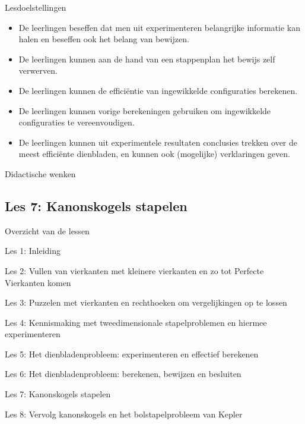 \documentclass[dutch]{beamer}
\begin{document}
\begin{frame}{Lesdoelstellingen}
\begin{itemize}
\item De leerlingen beseffen dat men uit experimenteren belangrijke informatie kan halen en beseffen ook het belang van bewijzen.
\item De leerlingen kunnen aan de hand van een stappenplan het bewijs zelf verwerven.
\item De leerlingen kunnen de effici\"{e}ntie van ingewikkelde configuraties berekenen.
\item De leerlingen kunnen vorige berekeningen gebruiken om ingewikkelde configuraties te vereenvoudigen.
\item De leerlingen kunnen uit experimentele resultaten conclusies trekken over de meest effici\"{e}nte dienbladen, en kunnen ook (mogelijke) verklaringen geven.
\end{itemize}
\end{frame}

\begin{frame}{Didactische wenken}
\end{frame}


\subsection{Les 7: Kanonskogels stapelen}
\begin{frame}
{Overzicht van de lessen}
\begin{list}{\quad}{}
\item Les 1: Inleiding
\item Les 2: Vullen van vierkanten met kleinere vierkanten en zo tot Perfecte Vierkanten komen
\item Les 3: Puzzelen met vierkanten en rechthoeken om vergelijkingen op te lossen
\item Les 4: Kennismaking met tweedimensionale stapelproblemen en hiermee experimenteren
\item Les 5: Het dienbladenprobleem: experimenteren en effectief berekenen
\item Les 6: Het dienbladenprobleem: berekenen, bewijzen en besluiten
\item {\color{blue}Les 7: Kanonskogels stapelen}
\item Les 8: Vervolg kanonskogels en het bolstapelprobleem van Kepler
\end{list}
\end{frame}
\end{document}
